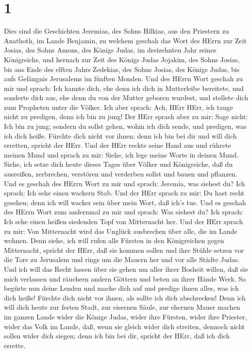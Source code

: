 \hypertarget{section}{%
\section{1}\label{section}}

 Dies sind die Geschichten Jeremias, des Sohns Hilkias, aus
den Priestern zu Anathoth, im Lande Benjamin,  zu welchem
geschah das Wort des HErrn zur Zeit Josias, des Sohns Amons, des Königs
Judas, im dreizehnten Jahr seines Königreichs,  und hernach
zur Zeit des Königs Judas Jojakim, des Sohns Josias, bis ans Ende des
elften Jahrs Zedekias, des Sohns Josias, des Königs Judas, bis aufs
Gefängnis Jerusalems im fünften Monden.  Und des HErrn Wort
geschah zu mir und sprach:  Ich kannte dich, ehe denn ich
dich in Mutterleibe bereitete, und sonderte dich aus, ehe denn du von
der Mutter geboren wurdest, und stellete dich zum Propheten unter die
Völker.  Ich aber sprach: Ach, HErr HErr, ich tauge nicht zu
predigen, denn ich bin zu jung!  Der HErr sprach aber zu
mir: Sage nicht: Ich bin zu jung; sondern du sollst gehen, wohin ich
dich sende, und predigen, was ich dich heiße.  Fürchte dich
nicht vor ihnen; denn ich bin bei dir und will dich erretten, spricht
der HErr.  Und der HErr reckte seine Hand aus und rührete
meinen Mund und sprach zu mir: Siehe, ich lege meine Worte in deinen
Mund.  Siehe, ich setze dich heute dieses Tages über Völker
und Königreiche, daß du ausreißen, zerbrechen, verstören und verderben
sollst und bauen und pflanzen.  Und es geschah des HErrn
Wort zu mir und sprach: Jeremia, was siehest du? Ich sprach: Ich sehe
einen wackern Stab.  Und der HErr sprach zu mir: Du hast
recht gesehen; denn ich will wacker sein über mein Wort, daß ich's tue.
 Und es geschah des HErrn Wort zum andernmal zu mir und
sprach: Was siehest du? Ich sprach: Ich sehe einen heißen siedenden Topf
von Mitternacht her.  Und der HErr sprach zu mir: Von
Mitternacht wird das Unglück ausbrechen über alle, die im Lande wohnen.
 Denn siehe, ich will rufen alle Fürsten in den
Königreichen gegen Mitternacht, spricht der HErr, daß sie kommen sollen
und ihre Stühle setzen vor die Tore zu Jerusalem und rings um die Mauern
her und vor alle Städte Judas.  Und ich will das Recht
lassen über sie gehen um aller ihrer Bosheit willen, daß sie mich
verlassen und räuchern andern Göttern und beten an ihrer Hände Werk.
 So begürte nun deine Lenden und mache dich auf und predige
ihnen alles, was ich dich heiße! Fürchte dich nicht vor ihnen, als
sollte ich dich abschrecken!  Denn ich will dich heute zur
festen Stadt, zur eisernen Säule, zur ehernen Mauer machen im ganzen
Lande wider die Könige Judas, wider ihre Fürsten, wider ihre Priester,
wider das Volk im Lande,  daß, wenn sie gleich wider dich
streiten, dennoch nicht sollen wider dich siegen; denn ich bin bei dir,
spricht der HErr, daß ich dich errette.

